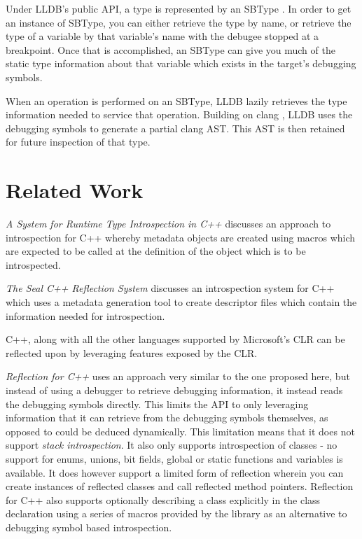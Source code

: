 \documentclass{report}
\begin{document}
Under LLDB's public API, a type is represented by an SBType \autocite{sbtype}. In
order to get an instance of SBType, you can either retrieve the type by name, or
retrieve the type of a variable by that variable's name with the debugee stopped
at a breakpoint. Once that is accomplished, an SBType can give you much of the
static type information about that variable which exists in the target's
debugging symbols.

When an operation is performed on an SBType, LLDB lazily retrieves the type
information needed to service that operation. Building on clang \autocite{clang},
LLDB uses the debugging symbols to generate a partial clang AST. This AST is
then retained for future inspection of that type.

\section{Related Work}
\emph{A System for Runtime Type Introspection in C++}
\autocite{deBayser:2012:SRT:2415308.2415317} discusses an approach to introspection
for C++ whereby metadata objects are created using macros which are expected to
be called at the definition of the object which is to be introspected.

\emph{The Seal C++ Reflection System} \autocite{seal-cpp} discusses an introspection
system for C++ which uses a metadata generation tool to create descriptor files
which contain the information needed for introspection.

C++, along with all the other languages supported by Microsoft's CLR can be
reflected upon by leveraging features exposed by the CLR. \autocite{clr-cpp}

\emph{Reflection for C++} \autocite{reflection-for-cpp} uses an approach very
similar to the one proposed here, but instead of using a debugger to retrieve
debugging information, it instead reads the debugging symbols directly. This
limits the API to only leveraging information that it can retrieve from the
debugging symbols themselves, as opposed to could be deduced dynamically. This
limitation means that it does not support \emph{stack introspection}. It also
only supports introspection of classes - no support for enums, unions, bit
fields, global or static functions and variables is available. It does however
support a limited form of reflection wherein you can create instances of
reflected classes and call reflected method pointers. Reflection for C++ also
supports optionally describing a class explicitly in the class declaration using
a series of macros provided by the library as an alternative to debugging symbol
based introspection.
\end{document}
